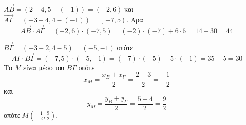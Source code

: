 \begin{alist}
\item $ \overrightarrow{AB}=(2-4,5-(-1))=(-2,6) $ και $ \overrightarrow{A\varGamma}=(-3-4,4-(-1))=(-7,5) $. Άρα
\[ \overrightarrow{AB}\cdot\overrightarrow{A\varGamma}=(-2,6)\cdot(-7,5)=(-2)\cdot(-7)+6\cdot 5=14+30=44 \]
\item $ \overrightarrow{B\varGamma}=(-3-2,4-5)=(-5,-1) $ οπότε
\[ \overrightarrow{A\varGamma}\cdot\overrightarrow{B\varGamma}=(-7,5)\cdot(-5,-1)=(-7)\cdot(-5)+5\cdot(-1)=35-5=30 \]
Το $ M $ είναι μέσο του $ B\varGamma $ οπότε 
\[ x_M=\frac{x_B+x_{\varGamma}}{2}=\frac{2-3}{2}=-\frac{1}{2} \]
και
\[ y_M=\frac{y_B+y_{\varGamma}}{2}=\frac{5+4}{2}=\frac{9}{2} \]
οπότε $ M\left(-\frac{1}{2},\frac{9}{2}\right) $.
\end{alist}
